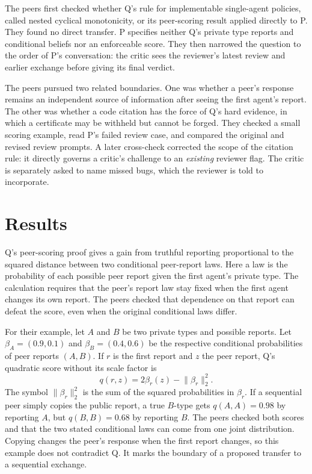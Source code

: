 \documentclass{article}
\begin{document}
The peers first checked whether Q's rule for implementable single-agent policies, called nested
cyclical monotonicity, or its peer-scoring result applied directly to P. They found no direct
transfer. P specifies neither Q's private type reports and conditional beliefs nor an enforceable
score. They then narrowed the question to the order of P's conversation: the critic sees the
reviewer's latest review and earlier exchange before giving its final verdict.

The peers pursued two related boundaries. One was whether a peer's response remains an independent
source of information after seeing the first agent's report. The other was whether a code citation
has the force of Q's hard evidence, in which a certificate may be withheld but cannot be forged.
They checked a small scoring example, read P's failed review case, and compared the original and
revised review prompts. A later cross-check corrected the scope of the citation rule: it directly
governs a critic's challenge to an \emph{existing} reviewer flag. The critic is separately asked to
name missed bugs, which the reviewer is told to incorporate.

\clearpage
\section{Results}

Q's peer-scoring proof gives a gain from truthful reporting proportional to the squared distance
between two conditional peer-report laws. Here a law is the probability of each possible peer report
given the first agent's private type. The calculation requires that the peer's report law stay fixed
when the first agent changes its own report. The peers checked that dependence on that report can
defeat the score, even when the original conditional laws differ.

For their example, let \(A\) and \(B\) be two private types and possible reports. Let
\(\beta_A=(0.9,0.1)\) and \(\beta_B=(0.4,0.6)\) be the respective conditional probabilities of peer
reports \((A,B)\). If \(r\) is the first report and \(z\) the peer report, Q's quadratic score
without its scale factor is
\[
q(r,z)=2\beta_r(z)-\lVert\beta_r\rVert_2^2.
\]
The symbol \(\lVert\beta_r\rVert_2^2\) is the sum of the squared probabilities in \(\beta_r\). If a
sequential peer simply copies the public report, a true \(B\)-type gets \(q(A,A)=0.98\) by reporting
\(A\), but \(q(B,B)=0.68\) by reporting \(B\). The peers checked both scores and that the two stated
conditional laws can come from one joint distribution. Copying changes the peer's response when the
first report changes, so this example does not contradict Q. It marks the boundary of a proposed
transfer to a sequential exchange.
\end{document}
